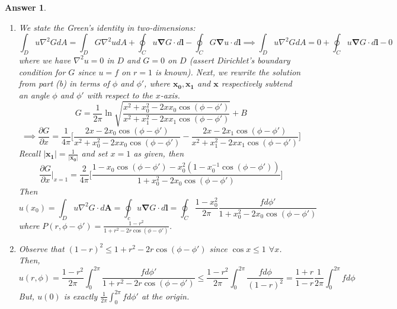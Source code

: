 \documentclass[a4paper]{article}
\newtheorem{ans}{Answer}[section]
\theoremstyle{new}
\begin{document}
\begin{ans}
\begin{enumerate}[label=(\alph*)]
\item We state the Green's identity in two-dimensions:
$$\int_D u\nabla^2GdA=\int_D G\nabla^2udA+\oint_C u\boldsymbol{\nabla}G\cdot d\mathbf{l}-\oint_C G\boldsymbol{\nabla}u\cdot d\mathbf{l}\implies\int_Du\nabla^2GdA=0+\oint_Cu\boldsymbol{\nabla}G\cdot d\mathbf{l}-0$$
where we have $\nabla^2u=0$ in $D$ and $G=0$ on $D$ (assert Dirichlet's boundary condition for $G$ since $u=f$ on $r=1$ is known). Next, we rewrite the solution from part (b) in terms of $\phi$ and $\phi'$, where $\mathbf{x_0},\mathbf{x_1}$ and $\mathbf{x}$ respectively subtend an angle $\phi$ and $\phi'$ with respect to the $x$-axis.
$$G=\frac{1}{2\pi}\ln\sqrt{\frac{x^2+x_0^2-2xx_0\cos(\phi-\phi')} {x^2+x_1^2-2xx_1\cos(\phi-\phi')}}+B$$
$$\implies\frac{\partial G}{\partial x}=\frac{1}{4\pi}\bigg[\frac{2x-2x_0\cos(\phi-\phi')}{x^2+x_0^2-2xx_0\cos(\phi-\phi')}-\frac{2x-2x_1\cos(\phi-\phi')}{x^2+x_1^2-2xx_1\cos(\phi-\phi')}\bigg]$$
Recall $|\mathbf{x_1}|=\frac{1}{|\mathbf{x_0}|}$ and set $x=1$ as given, then
$$\frac{\partial G}{\partial x}\bigg|_{x=1}=\frac{2}{4\pi}\bigg[\frac{1-x_0\cos(\phi-\phi')-x_0^2(1-x_0^{-1}\cos(\phi-\phi'))}{1+x_0^2-2x_0\cos(\phi-\phi')}\bigg]$$
Then
$$u(x_0)=\int_Du\nabla^2G\cdot d\mathbf{A}=\oint_cu\boldsymbol{\nabla}G\cdot d\mathbf{l}=\oint_C\frac{1-x_0^2}{2\pi}\frac{fd\phi'}{1+x_0^2-2x_0\cos(\phi-\phi')}$$
where $P(r,\phi-\phi')=\frac{1-r^2}{1+r^2-2r\cos(\phi-\phi')}$.
\item Observe that $(1-r)^2\leq 1+r^2-2r\cos(\phi-\phi')$ since $\cos x\leq 1$ $\forall x$. Then,
$$u(r,\phi)=\frac{1-r^2}{2\pi}\int_0^{2\pi}\frac{fd\phi'}{1+r^2-2r\cos(\phi-\phi')}\leq\frac{1-r^2}{2\pi}\int_0^{2\pi}\frac{fd\phi}{(1-r)^2}=\frac{1+r}{1-r}\frac{1}{2\pi}\int_0^{2\pi}fd\phi$$
But, $u(0)$ is exactly $\frac{1}{2\pi}\int_0^{2\pi}fd\phi'$ at the origin.
\end{enumerate}
\end{ans}
\newpage
\end{document}
